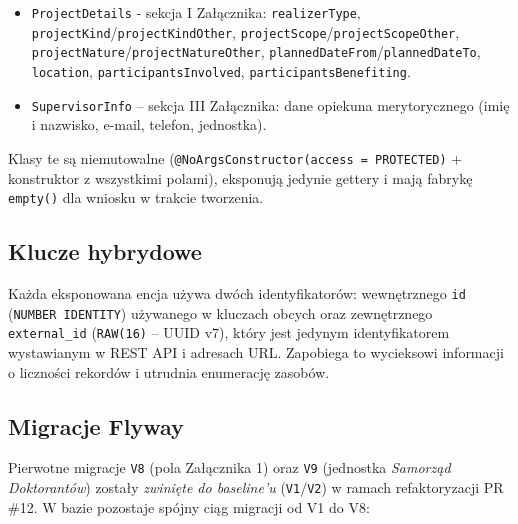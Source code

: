 \documentclass[12pt,a4paper]{article}
\begin{document}
\begin{itemize}[leftmargin=*]
  \item \texttt{ProjectDetails} - sekcja I Załącznika: \texttt{realizerType},
        \texttt{projectKind}/\texttt{projectKindOther},
        \texttt{projectScope}/\texttt{projectScopeOther},
        \texttt{projectNature}/\texttt{projectNatureOther},
        \texttt{plannedDateFrom}/\texttt{plannedDateTo}, \texttt{location},
        \texttt{participantsInvolved}, \texttt{participantsBenefiting}.
  \item \texttt{SupervisorInfo} -- sekcja III Załącznika: dane opiekuna
        merytorycznego (imię i nazwisko, e-mail, telefon, jednostka).
\end{itemize}

Klasy te są niemutowalne (\texttt{@NoArgsConstructor(access = PROTECTED)} +
konstruktor z wszystkimi polami), eksponują jedynie gettery i mają fabrykę
\texttt{empty()} dla wniosku w trakcie tworzenia.

\subsection{Klucze hybrydowe}
Każda eksponowana encja używa dwóch identyfikatorów:
wewnętrznego \texttt{id} (\texttt{NUMBER IDENTITY}) używanego w kluczach obcych
oraz zewnętrznego \texttt{external\_id} (\texttt{RAW(16)} -- UUID v7),
który jest jedynym identyfikatorem wystawianym w REST API i adresach URL.
Zapobiega to wycieksowi informacji o liczności rekordów i utrudnia enumerację zasobów.

\subsection{Migracje Flyway}
Pierwotne migracje \texttt{V8} (pola Załącznika 1) oraz \texttt{V9} (jednostka
\emph{Samorząd Doktorantów}) zostały \emph{zwinięte do baseline'u}
(\texttt{V1}/\texttt{V2}) w ramach refaktoryzacji PR \#12. W bazie pozostaje
spójny ciąg migracji od V1 do V8:
\end{document}
